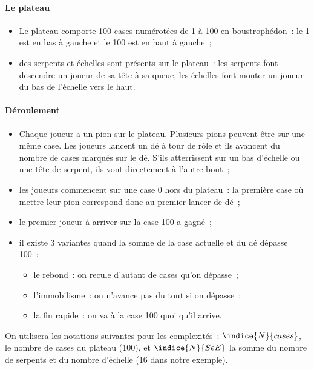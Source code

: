 \paragraph*{Le plateau}

\begin{itemize}
	\item Le plateau comporte 100 cases numérotées de 1 à 100 en boustrophédon~: le 1 est en bas à gauche et le 100 est en haut à gauche~;
	\item des serpents et échelles sont présents sur le plateau~: les serpents font descendre un joueur de sa tête à sa queue, les échelles font monter un joueur du bas de l'échelle vers le haut.
\end{itemize}

\paragraph*{Déroulement}

\begin{itemize}
	\item Chaque joueur a un pion sur le plateau. Plusieurs pions peuvent être sur une même case. Les joueurs lancent un dé à tour de rôle et ils avancent du nombre de cases marqués sur le dé. S'ils atterrissent sur un bas d'échelle ou une tête de serpent, ils vont directement à l'autre bout~;
	\item les joueurs commencent sur une case 0 hors du plateau~: la première case où mettre leur pion correspond donc au premier lancer de dé~;
	\item le premier joueur à arriver sur la case 100 a gagné~; 
	\item il existe 3 variantes quand la somme de la case actuelle et du dé dépasse 100~:
	\begin{itemize}
		\item le rebond~: on recule d'autant de cases qu'on dépasse~;
		\item l'immobilisme~: on n'avance pas du tout si on dépasse~: 
		\item la fin rapide~: on va à la case 100 quoi qu'il arrive. 
	\end{itemize}
\end{itemize}

On utilisera les notations suivantes pour les complexités~: $\indice{N}{cases}$, le nombre de cases du plateau (100), et $\indice{N}{SeE}$ la somme du nombre de serpents et du nombre d'échelle (16 dans notre exemple).

